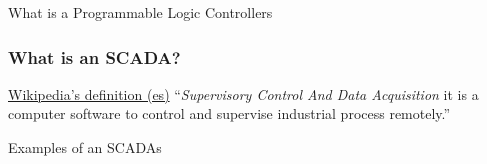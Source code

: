 \documentclass{beamer}
\begin{document}
\begin{frame}
    \begin{exampleblock}{What is a Programmable Logic Controllers}
        \begin{figure}[h]
        \end{figure}
    \end{exampleblock}
\end{frame}

\begin{frame}
\frametitle{What is an SCADA?}
    \begin{block}{\href{http://es.wikipedia.org/wiki/SCADA}{Wikipedia's definition (es)}}
        ``\emph{Supervisory Control And Data Acquisition} it is a computer software to control and supervise industrial process remotely.''
    \end{block}
    \begin{exampleblock}{Examples of an SCADAs}
        \begin{figure}[h]
        \end{figure}
    \end{exampleblock}
\end{frame}
\end{document}
